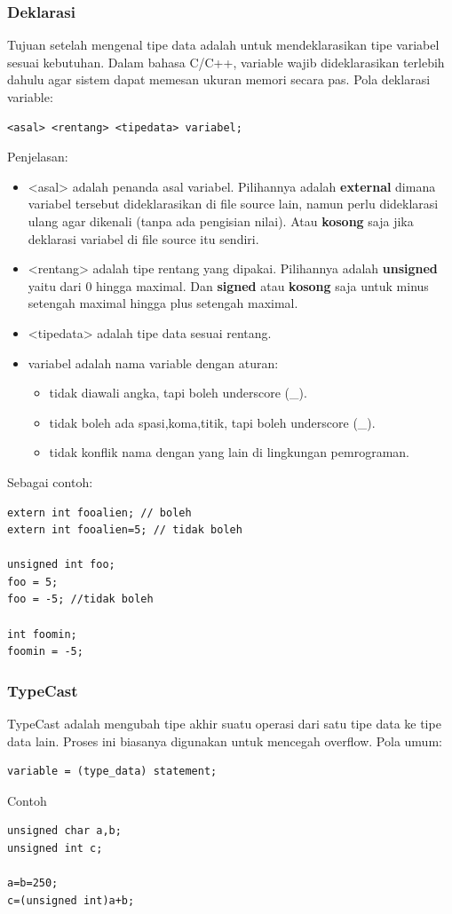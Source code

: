 \documentclass[12pt,]{article}
\begin{document}
	\subsubsection{Deklarasi}
	Tujuan setelah mengenal tipe data adalah untuk mendeklarasikan tipe variabel sesuai kebutuhan.
	Dalam bahasa C/C++, variable wajib dideklarasikan terlebih dahulu agar sistem dapat memesan ukuran memori secara pas.
	Pola deklarasi variable:
	\begin{verbatim}
<asal> <rentang> <tipedata> variabel;
	\end{verbatim}
	Penjelasan:
	\begin{itemize}
		\item <asal> adalah penanda asal variabel. Pilihannya adalah \textbf{external} dimana variabel tersebut dideklarasikan di file source lain,
		namun perlu dideklarasi ulang agar dikenali (tanpa ada pengisian nilai).
		Atau \textbf{kosong} saja jika deklarasi variabel di file source itu sendiri.
		\item <rentang> adalah tipe rentang yang dipakai.
		Pilihannya adalah \textbf{unsigned} yaitu dari 0 hingga maximal.
		Dan \textbf{signed} atau \textbf{kosong} saja untuk minus setengah maximal hingga plus setengah maximal.
		\item <tipedata> adalah tipe data sesuai rentang.
		\item variabel adalah nama variable dengan aturan:
		\begin{itemize}
			\item tidak diawali angka, tapi boleh underscore (\_).
			\item tidak boleh ada spasi,koma,titik, tapi boleh underscore (\_).
			\item tidak konflik nama dengan yang lain di lingkungan pemrograman.
		\end{itemize}
	\end{itemize}

	Sebagai contoh:
	\begin{verbatim}
extern int fooalien; // boleh
extern int fooalien=5; // tidak boleh

unsigned int foo;
foo = 5;
foo = -5; //tidak boleh

int foomin;
foomin = -5;
	\end{verbatim}

	\subsubsection{TypeCast}
	TypeCast adalah mengubah tipe akhir suatu operasi dari satu tipe data ke tipe data lain.
	Proses ini biasanya digunakan untuk mencegah overflow.
	Pola umum:
	\begin{verbatim}
variable = (type_data) statement;
	\end{verbatim}
	Contoh
	\begin{verbatim}
unsigned char a,b;
unsigned int c;

a=b=250;
c=(unsigned int)a+b;
	\end{verbatim}
\end{document}
